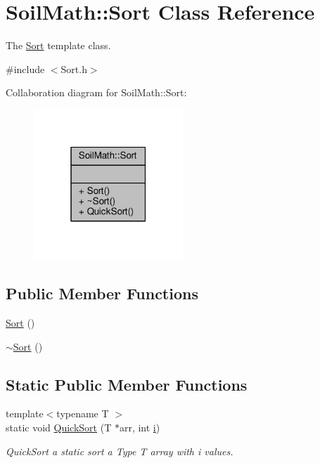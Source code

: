 \hypertarget{class_soil_math_1_1_sort}{}\section{Soil\+Math\+:\+:Sort Class Reference}
\label{class_soil_math_1_1_sort}


The \hyperlink{class_soil_math_1_1_sort}{Sort} template class.  




{\ttfamily \#include $<$Sort.\+h$>$}



Collaboration diagram for Soil\+Math\+:\+:Sort\+:\nopagebreak
\begin{figure}[H]
\begin{center}
\leavevmode
\includegraphics[width=159pt]{class_soil_math_1_1_sort__coll__graph}
\end{center}
\end{figure}
\subsection*{Public Member Functions}
\begin{DoxyCompactItemize}
\item 
\hyperlink{class_soil_math_1_1_sort_ac5553af8753454e71e6d621690fdab3f}{Sort} ()
\item 
\hyperlink{class_soil_math_1_1_sort_a62273dbd3620f999201abacdff5e2557}{$\sim$\+Sort} ()
\end{DoxyCompactItemize}
\subsection*{Static Public Member Functions}
\begin{DoxyCompactItemize}
\item 
{\footnotesize template$<$typename T $>$ }\\static void \hyperlink{class_soil_math_1_1_sort_adca7b48be7482f89767b806ad2016d67}{Quick\+Sort} (T $\ast$arr, int \hyperlink{_v_s_a___u_t_2_comparision_pictures_2_createtest_image_8m_a6f6ccfcf58b31cb6412107d9d5281426}{i})
\begin{DoxyCompactList}\small\item\em Quick\+Sort a static sort a Type T array with i values. \end{DoxyCompactList}\end{DoxyCompactItemize}


